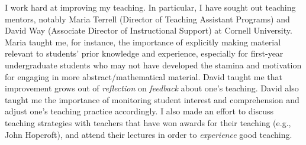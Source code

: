 \documentclass[10,a4paper,sans]{moderncv}
\begin{document}
I work hard at improving my teaching. In particular, I have sought out teaching mentors, notably Maria Terrell (Director of Teaching Assistant Programs) and David Way (Associate Director of Instructional Support) at Cornell University. Maria taught me, for instance, the importance of explicitly making material relevant to students' prior knowledge and experience, especially for first-year undergraduate students who may not have developed the stamina and motivation for engaging in more abstract/mathematical material. David taught me that improvement grows out of \textit{reflection} on \textit{feedback} about one's teaching. David also taught me the importance of monitoring student interest and comprehension and adjust one's teaching practice accordingly. I also made an effort to discuss teaching strategies with teachers that have won awards for their teaching (e.g., John Hopcroft), and attend their lectures in order 
to \textit{experience} good teaching.
\end{document}
